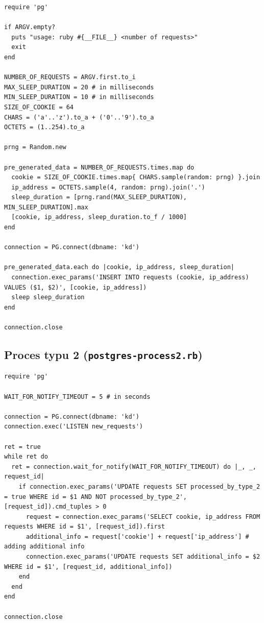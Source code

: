\documentclass[a4paper,11pt]{article}
\begin{document}
\begin{lstlisting}
require 'pg'

if ARGV.empty?
  puts "usage: ruby #{__FILE__} <number of requests>"
  exit
end

NUMBER_OF_REQUESTS = ARGV.first.to_i
MAX_SLEEP_DURATION = 20 # in milliseconds
MIN_SLEEP_DURATION = 10 # in milliseconds
SIZE_OF_COOKIE = 64
CHARS = ('a'..'z').to_a + ('0'..'9').to_a
OCTETS = (1..254).to_a

prng = Random.new

pre_generated_data = NUMBER_OF_REQUESTS.times.map do
  cookie = SIZE_OF_COOKIE.times.map{ CHARS.sample(random: prng) }.join
  ip_address = OCTETS.sample(4, random: prng).join('.')
  sleep_duration = [prng.rand(MAX_SLEEP_DURATION), MIN_SLEEP_DURATION].max
  [cookie, ip_address, sleep_duration.to_f / 1000]
end

connection = PG.connect(dbname: 'kd')

pre_generated_data.each do |cookie, ip_address, sleep_duration|
  connection.exec_params('INSERT INTO requests (cookie, ip_address) VALUES ($1, $2)', [cookie, ip_address])
  sleep sleep_duration
end

connection.close
\end{lstlisting}


\subsection{Proces typu 2 (\texttt{postgres-process2.rb})}

\begin{lstlisting}
require 'pg'

WAIT_FOR_NOTIFY_TIMEOUT = 5 # in seconds

connection = PG.connect(dbname: 'kd')
connection.exec('LISTEN new_requests')

ret = true
while ret do
  ret = connection.wait_for_notify(WAIT_FOR_NOTIFY_TIMEOUT) do |_, _, request_id|
    if connection.exec_params('UPDATE requests SET processed_by_type_2 = true WHERE id = $1 AND NOT processed_by_type_2', [request_id]).cmd_tuples > 0
      request = connection.exec_params('SELECT cookie, ip_address FROM requests WHERE id = $1', [request_id]).first
      additional_info = request['cookie'] + request['ip_address'] # adding additional info
      connection.exec_params('UPDATE requests SET additional_info = $2 WHERE id = $1', [request_id, additional_info])
    end
  end
end

connection.close
\end{lstlisting}
\end{document}
